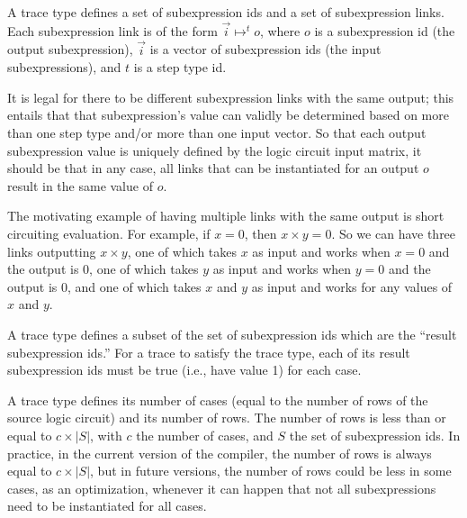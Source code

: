 \documentclass[11pt]{article}
\begin{document}
A trace type defines a set of subexpression ids and a set of subexpression links. Each subexpression link is of the form $\vec{i} \mapsto^t o$, where $o$ is a subexpression id (the output subexpression), $\vec{i}$ is a vector of subexpression ids (the input subexpressions), and $t$ is a step type id.

It is legal for there to be different subexpression links with the same output; this entails that that subexpression's value can validly be determined based on more than one step type and/or more than one input vector. So that each output subexpression value is uniquely defined by the logic circuit input matrix, it should be that in any case, all links that can be instantiated for an output $o$ result in the same value of $o$.

The motivating example of having multiple links with the same output is short circuiting evaluation. For example, if $x = 0$, then $x \times y = 0$. So we can have three links outputting $x \times y$, one of which takes $x$ as input and works when $x = 0$ and the output is 0, one of which takes $y$ as input and works when $y = 0$ and the output is 0, and one of which takes $x$ and $y$ as input and works for any values of $x$ and $y$.

A trace type defines a subset of the set of subexpression ids which are the ``result subexpression ids.'' For a trace to satisfy the trace type, each of its result subexpression ids must be true (i.e., have value 1) for each case.

A trace type defines its number of cases (equal to the number of rows of the source logic circuit) and its number of rows. The number of rows is less than or equal to $c \times |S|$, with $c$ the number of cases, and $S$ the set of subexpression ids. In practice, in the current version of the compiler, the number of rows is always equal to $c \times |S|$, but in future versions, the number of rows could be less in some cases, as an optimization, whenever it can happen that not all subexpressions need to be instantiated for all cases.
\end{document}
